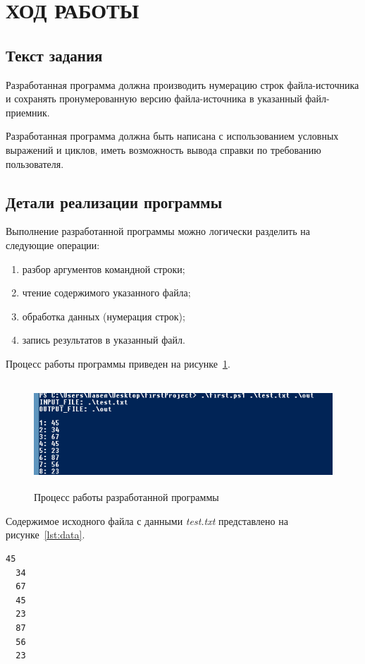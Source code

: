 \section{ХОД РАБОТЫ}

\subsection{Текст задания}

Разработанная программа должна производить нумерацию строк файла-источника
и сохранять пронумерованную версию файла-источника в указанный файл-приемник.

Разработанная программа должна быть написана с использованием условных выражений
и циклов, иметь возможность вывода справки по требованию пользователя.

\subsection{Детали реализации программы}

Выполнение разработанной программы можно логически разделить на следующие операции:

\begin{enumerate}
  \item разбор аргументов командной строки;
  \item чтение содержимого указанного файла;
  \item обработка данных (нумерация строк);
  \item запись результатов в указанный файл.
\end{enumerate}

Процесс работы программы приведен на рисунке~\ref{fig:process}.

\begin{figure}[htbp]
  \centering
  \includegraphics[width=150mm,height=40mm]{img/process}
  \caption{Процесс работы разработанной программы}\label{fig:process}
\end{figure}

\newpage

Содержимое исходного файла с данными \textit{test.txt} представлено на рисунке~\ref{lst:data}.
\begin{lstlisting}[caption=Содержимое исходного файла \textit{test.txt},label=lst:data]
  45
  34
  67
  45
  23
  87
  56
  23
\end{lstlisting}

